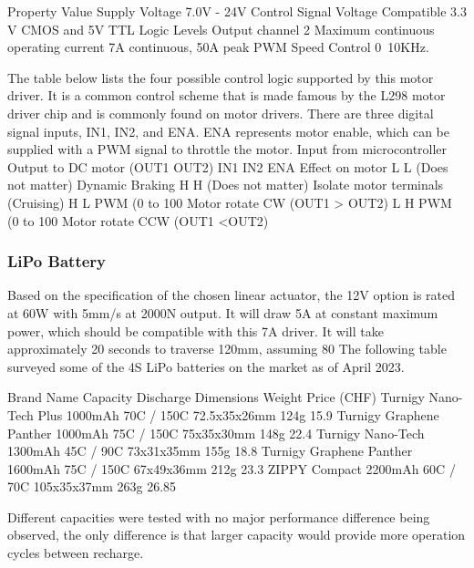 Property
Value
Supply Voltage
7.0V - 24V
Control Signal Voltage
Compatible 3.3 V CMOS and  5V TTL Logic Levels
Output channel
2
Maximum continuous operating current
7A continuous, 50A peak
PWM Speed Control
0~10KHz.



The table below lists the four possible control logic supported by this motor driver. It is a common control scheme that is made famous by the L298 motor driver chip and is commonly found on motor drivers. There are three digital signal inputs, IN1, IN2, and ENA. ENA represents motor enable, which can be supplied with a PWM signal to throttle the motor.
Input from microcontroller
Output to DC motor (OUT1 OUT2)
IN1
IN2
ENA 
Effect on motor 
L
L
(Does not matter)
Dynamic Braking
H
H
(Does not matter)
Isolate motor terminals (Cruising)
H
L
PWM (0 to 100%
Motor rotate CW (OUT1 > OUT2)
L
H
PWM (0 to 100%
Motor rotate CCW (OUT1 <OUT2)


\subsubsection{LiPo Battery}
\label{subsubsection:exploration_1_lipo_battery}

Based on the specification of the chosen linear actuator, the 12V option is rated at 60W with 5mm/s at 2000N output. It will draw 5A at constant maximum power, which should be compatible with this 7A driver. It will take approximately 20 seconds to traverse 120mm, assuming 80%
The following table surveyed some of the 4S LiPo batteries on the market as of April 2023. 

Brand Name
Capacity
Discharge 
Dimensions
Weight
Price (CHF)
Turnigy Nano-Tech Plus
1000mAh
70C / 150C
72.5x35x26mm
124g
15.9
Turnigy Graphene Panther 
1000mAh
75C / 150C
75x35x30mm
148g
22.4
Turnigy Nano-Tech
1300mAh
45C / 90C
73x31x35mm
155g
18.8
Turnigy Graphene Panther 
1600mAh
75C / 150C
 67x49x36mm
212g
23.3
ZIPPY Compact 
2200mAh
60C / 70C
105x35x37mm
263g
26.85

Different capacities were tested with no major performance difference being observed, the only difference is that larger capacity would provide more operation cycles between recharge.

